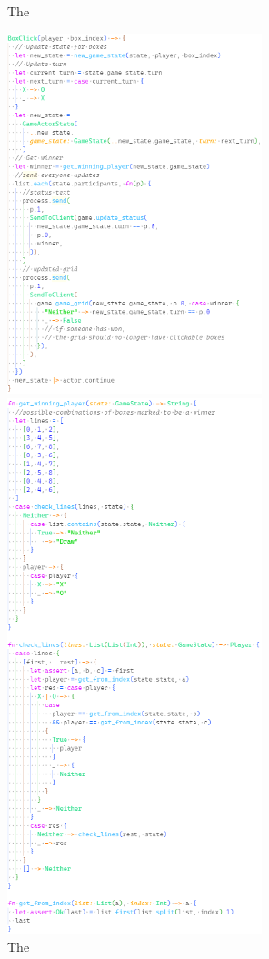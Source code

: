 \documentclass[]{project_interim}
\begin{document}
\begin{figure}
\begin{lstlisting}
  \end{lstlisting}
  \caption{The }\label{wrap-fig:9}
  \includegraphics[width=20em]{box_click}
  \caption{The }\label{wrap-fig:10}
  \includegraphics[width=20em]{get_winning_player}


\end{figure}
\end{document}
